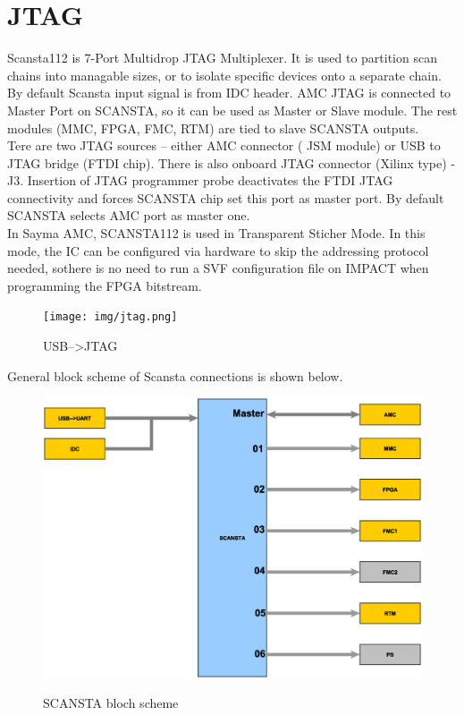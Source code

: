 \section{JTAG}
Scansta112 is 7-Port Multidrop JTAG Multiplexer. It is used to partition scan chains into managable sizes, or to isolate specific devices onto a separate chain. By default Scansta input signal is from IDC header. AMC JTAG is connected to Master Port on SCANSTA, so it can be used as Master or Slave module. The rest modules (MMC, FPGA, FMC, RTM) are tied to slave SCANSTA outputs. \\

Tere are two JTAG sources – either AMC connector ( JSM module) or USB to JTAG bridge (FTDI chip). There is also onboard JTAG connector (Xilinx type) -J3. Insertion of JTAG programmer probe deactivates the FTDI JTAG connectivity and forces SCANSTA chip set this port as master port. By default SCANSTA selects AMC port as master one.\\


In Sayma AMC, SCANSTA112 is used in Transparent Sticher Mode. In this mode, the IC can be configured via hardware to skip the addressing protocol needed, sothere is no need to run a SVF configuration file on IMPACT when programming the FPGA bitstream.\\
	\begin{figure}[htbp!]
		\centering
		\texttt{[image: img/jtag.png]}\\
		\caption{USB-->JTAG} 
	\end{figure}
\clearpage	
General block scheme of Scansta connections is shown below.\\
	
		\begin{figure}[htbp!]
			\centering
			\includegraphics[scale=0.4]{img/scansta.eps}\\
			\caption{SCANSTA bloch scheme} 
		\end{figure}
		
